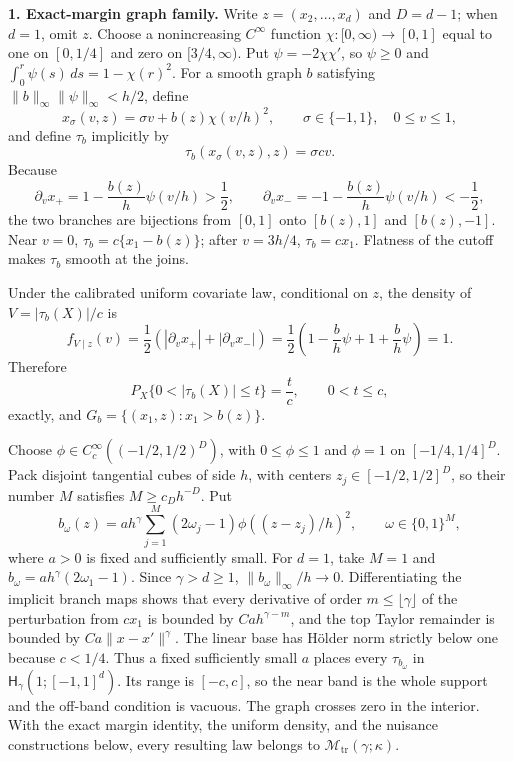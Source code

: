 \textbf{1. Exact-margin graph family.} Write \(z=(x_2,\ldots,x_d)\) and \(D=d-1\); when \(d=1\), omit \(z\). Choose a nonincreasing \(C^\infty\) function \(\chi:[0,\infty)\to[0,1]\) equal to one on \([0,1/4]\) and zero on \([3/4,\infty)\). Put \(\psi=-2\chi\chi'\), so \(\psi\ge0\) and \(\int_0^r\psi(s)\,ds=1-\chi(r)^2\). For a smooth graph \(b\) satisfying \(\|b\|_\infty\|\psi\|_\infty<h/2\), define
\[
x_\sigma(v,z)=\sigma v+b(z)\chi(v/h)^2,
\qquad \sigma\in\{-1,1\},\quad 0\le v\le1,
\]
and define \(\tau_b\) implicitly by
\[
\tau_b(x_\sigma(v,z),z)=\sigma cv.
\]
Because
\[
\partial_vx_+=1-\frac{b(z)}h\psi(v/h)>\frac12,
\qquad
\partial_vx_-=-1-\frac{b(z)}h\psi(v/h)<-\frac12,
\]
the two branches are bijections from \([0,1]\) onto \([b(z),1]\) and \([b(z),-1]\). Near \(v=0\), \(\tau_b=c\{x_1-b(z)\}\); after \(v=3h/4\), \(\tau_b=cx_1\). Flatness of the cutoff makes \(\tau_b\) smooth at the joins.

Under the calibrated uniform covariate law, conditional on \(z\), the density of \(V=|\tau_b(X)|/c\) is
\[
f_{V\mid z}(v)=\frac12\left(|\partial_vx_+|+|\partial_vx_-|\right)
=\frac12\left(1-\frac bh\psi+1+\frac bh\psi\right)=1.
\]
Therefore
\[
P_X\{0<|\tau_b(X)|\le t\}=\frac tc,
\qquad 0<t\le c,
\]
exactly, and \(G_b=\{(x_1,z):x_1>b(z)\}\).

Choose \(\phi\in C_c^\infty((-1/2,1/2)^D)\), with \(0\le\phi\le1\) and \(\phi=1\) on \([-1/4,1/4]^D\). Pack disjoint tangential cubes of side \(h\), with centers \(z_j\in[-1/2,1/2]^D\), so their number \(M\) satisfies \(M\ge c_Dh^{-D}\). Put
\[
b_\omega(z)=a h^\gamma\sum_{j=1}^M(2\omega_j-1)\phi((z-z_j)/h)^2,
\qquad \omega\in\{0,1\}^M,
\]
where \(a>0\) is fixed and sufficiently small. For \(d=1\), take \(M=1\) and \(b_\omega=a h^\gamma(2\omega_1-1)\). Since \(\gamma>d\ge1\), \(\|b_\omega\|_\infty/h\to0\). Differentiating the implicit branch maps shows that every derivative of order \(m\le\lfloor\gamma\rfloor\) of the perturbation from \(cx_1\) is bounded by \(Ca h^{\gamma-m}\), and the top Taylor remainder is bounded by \(Ca\|x-x'\|^\gamma\). The linear base has Hölder norm strictly below one because \(c<1/4\). Thus a fixed sufficiently small \(a\) places every \(\tau_{b_\omega}\) in \(\mathsf H_\gamma(1;[-1,1]^d)\). Its range is \([-c,c]\), so the near band is the whole support and the off-band condition is vacuous. The graph crosses zero in the interior. With the exact margin identity, the uniform density, and the nuisance constructions below, every resulting law belongs to \(\mathcal M_{\mathrm{tr}}(\gamma;\kappa)\).

